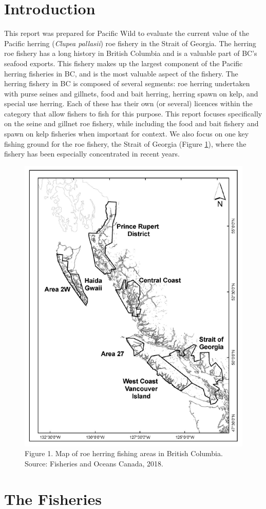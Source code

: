\documentclass[]{article}
\theoremstyle{definition}
\theoremstyle{definition}
\theoremstyle{definition}
\theoremstyle{remark}
\begin{document}
\section{Introduction}\label{introduction}

This report was prepared for Pacific Wild to evaluate the current value
of the Pacific herring (\emph{Clupea pallasii}) roe fishery in the
Strait of Georgia. The herring roe fishery has a long history in British
Columbia and is a valuable part of BC's seafood exports. This fishery
makes up the largest component of the Pacific herring fisheries in BC,
and is the most valuable aspect of the fishery. The herring fishery in
BC is composed of several segments: roe herring undertaken with purse
seines and gillnets, food and bait herring, herring spawn on kelp, and
special use herring. Each of these has their own (or several) licences
within the category that allow fishers to fish for this purpose. This
report focuses specifically on the seine and gillnet roe fishery, while
including the food and bait fishery and spawn on kelp fisheries when
important for context. We also focus on one key fishing ground for the
roe fishery, the Strait of Georgia (Figure \ref{fig:map}), where the
fishery has been especially concentrated in recent years.

\begin{figure}
\includegraphics[width=0.5\linewidth]{DFO_Map} \caption{Figure 1. Map of roe herring fishing areas in British Columbia. Source: Fisheries and Oceans Canada, 2018.}\label{fig:map}
\end{figure}

\section{The Fisheries}\label{the-fisheries}
\end{document}
